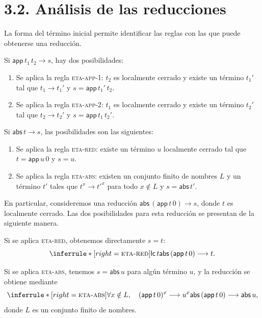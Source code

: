 \documentclass[
  spanish,
  letterpaper,
  DIV=11,
  numbers=noendperiod]{scrreprt}
\theoremstyle{remark}
\begin{document}
\section{3.2. Análisis de las
reducciones}\label{anuxe1lisis-de-las-reducciones}

La forma del término inicial permite identificar las reglas con las que
puede obtenerse una reducción.

Si \(\mathsf{app}\,t_1\,t_2\longrightarrow s\), hay dos posibilidades:

\begin{enumerate}
\def\labelenumi{\arabic{enumi}.}
\item
  Se aplica la regla \textsc{eta-app-1}: \(t_2\) es localmente cerrado y
  existe un término \(t_1'\) tal que \(t_1\longrightarrow t_1'\) y
  \(s=\mathsf{app}\,t_1'\,t_2\).
\item
  Se aplica la regla \textsc{eta-app-2}: \(t_1\) es localmente cerrado y
  existe un término \(t_2'\) tal que \(t_2\longrightarrow t_2'\) y
  \(s=\mathsf{app}\,t_1\,t_2'\).
\end{enumerate}

Si \(\mathsf{abs}\,t\longrightarrow s\), las posibilidades son las
siguientes:

\begin{enumerate}
\def\labelenumi{\arabic{enumi}.}
\item
  Se aplica la regla \textsc{eta-red}: existe un término \(u\)
  localmente cerrado tal que \(t=\mathsf{app}\,u\,0\) y \(s=u\).
\item
  Se aplica la regla \textsc{eta-abs}: existen un conjunto finito de
  nombres \(L\) y un término \(t'\) tales que
  \(t^x\longrightarrow t'^x\) para todo \(x\notin L\) y
  \(s=\mathsf{abs}\,t'\).
\end{enumerate}

En particular, consideremos una reducción
\(\mathsf{abs}\,(\mathsf{app}\,t\,0)\longrightarrow s\), donde \(t\) es
localmente cerrado. Las dos posibilidades para esta reducción se
presentan de la siguiente manera.

Si se aplica \textsc{eta-red}, obtenemos directamente \(s=t\): \[
\inferrule*[right=\textsc{eta-red}]
  {\mathsf{lc}\,t}
  {\mathsf{abs}\,(\mathsf{app}\,t\,0)\longrightarrow t}.
\]

Si se aplica \textsc{eta-abs}, tenemos \(s=\mathsf{abs}\,u\) para algún
término \(u\), y la reducción se obtiene mediante \[
\inferrule*[right=\textsc{eta-abs}]
  {\forall x\notin L,\quad
   (\mathsf{app}\,t\,0)^x\longrightarrow u^x}
  {\mathsf{abs}\,(\mathsf{app}\,t\,0)
   \longrightarrow\mathsf{abs}\,u},
\] donde \(L\) es un conjunto finito de nombres.
\end{document}
